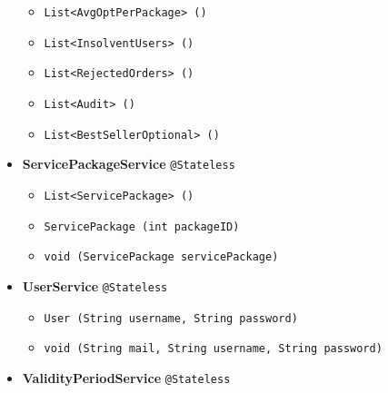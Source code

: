 \begin{itemize}
\begin{itemize}[label = {$\circ$}]
            \item \texttt{List<AvgOptPerPackage> ()}
            \item \texttt{List<InsolventUsers> ()}
            \item \texttt{List<RejectedOrders> ()}
            \item \texttt{List<Audit> ()}
            \item \texttt{List<BestSellerOptional> ()}
        \end{itemize}
    \item \textbf{ServicePackageService} \texttt{@Stateless}
        \begin{itemize}[label = {$\circ$}]
            \item \texttt{List<ServicePackage> ()}
            \item \texttt{ServicePackage (int packageID)}
            \item \texttt{void (ServicePackage servicePackage)}
        \end{itemize}
    \item \textbf{UserService} \texttt{@Stateless}
        \begin{itemize}[label = {$\circ$}]
            \item \texttt{User (String username, String password)}
            \item \texttt{void (String mail, String username, String password)}
        \end{itemize}
    \item \textbf{ValidityPeriodService} \texttt{@Stateless}    
\end{itemize}
